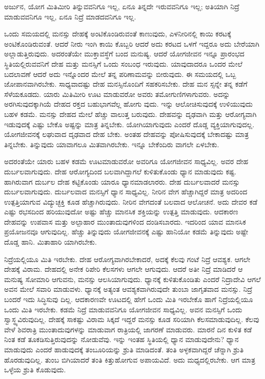 {\small ಅರ್ಜುನ, ಯೋಗ ಮಿತಿಮೀರಿ ತಿನ್ನುವವನಿಗೂ ಇಲ್ಲ, ಏನೂ ತಿನ್ನದೇ ಇರುವವನಿಗೂ ಇಲ್ಲ; ಅತಿಯಾಗಿ ನಿದ್ರೆ ಮಾಡುವವನಿಗೂ ಇಲ್ಲ, ಏನೂ ನಿದ್ರೆ ಮಾಡದವನಿಗೂ ಇಲ್ಲ.}

ಒಂದು ಸಮಯದಲ್ಲಿ ಮನಸ್ಸು ದೇಹಕ್ಕೆ ಅಂಟಿಕೊಂಡಿರುವಂತೆ ಕಾಣುವುದು, ಎಳನೀರಿನಲ್ಲಿ ಕಾಯಿ ಕರಟಕ್ಕೆ ಅಂಟಿಕೊಂಡಿರುವಂತೆ. ಆದರೆ ನೀರು ಇಂಗಿ ಕಾಯಿ ಕೊಬ್ಬರಿ ಆದರೆ ಅದು ಕರಟದ ಒಳಗೆ ಇದ್ದರೂ ಅದು ಬೇರೆಯಾಗಿ ಅಲ್ಲಾಡುತ್ತಿರುವುದು. ಅದರಂತೆಯೇ ಮುಕ್ತಾವಸ್ಥೆಗೆ ಬಂದ ಮನುಷ್ಯ. ಆದರೆ ಯೋಗಜೀವನ ಇನ್ನೂ ಪ್ರಾರಂಭದ ಸ್ಥಿತಿಯಲ್ಲಿರುವವನಿಗೆ ದೇಹ ಮತ್ತು ಮನಸ್ಸಿಗೆ ಒಂದು ಸಂಬಂಧ ಇರುವುದು. ಯಾವುದಾದರೂ ಒಂದರ ಮೇಲೆ ಬದಲಾವಣೆ ಆದರೆ ಅದು ಇನ್ನೊಂದರ ಮೇಲೆ ತನ್ನ ಪರಿಣಾಮವನ್ನು ಬೀರುವುದು. ಈ ಸಮಯದಲ್ಲಿ ಒಬ್ಬ ಜೋಪಾನವಾಗಿರಬೇಕು. ಸಾಧ್ಯವಾದಷ್ಟು ದೇಹ ಮನಸ್ಸಿನೊಂದಿಗೆ ಸಹಕರಿಸಬೇಕು. ದೇಹ ಮನ ಸ್ಸನ್ನೇ ತನ್ನ ಕಡೆಗೆ ಸೆಳೆಯಕೂಡದು. ಯಾರು ಮಿತಿಮೀರಿ ಊಟ ಮಾಡುವರೋ ಅವರು ತಮೋಗುಣಿಗಳಾಗುವರು. ಅದನ್ನು ಅರಗಿಸುವುದಕ್ಕಾಗಿಯೆ ದೇಹದ ರಕ್ತದ ಬಹುಭಾಗವೆಲ್ಲ ಹೋಗು ವುದು. ಇನ್ನು ಆಲೋಚಿಸುವುದಕ್ಕೆ ಉಳಿಯುವುದು ಬಹಳ ಕಡಮೆ. ಮನಸ್ಸು ದೇಹದ ಮೇಲೆ ಹೆಚ್ಚು ವಾಲುತ್ತ ಬರುವುದು. ದೇಹವನ್ನು ದೃಢವಾಗಿ ಮತ್ತು ಆರೋಗ್ಯವಾಗಿ ಇಡುವುದಕ್ಕೆ ಎಷ್ಟು ಬೇಕೊ ಅಷ್ಟನ್ನು ಮಾತ್ರ ತಿನ್ನಬೇಕು. ಯೋಗಿಯಾಗುವುದು ಎಂದರೆ ದೊಡ್ಡ ವ್ಯಕ್ತಿಯಾಗುವುದಲ್ಲ. ಯೋಗಜೀವನಕ್ಕೆ ಲಘುವಾದ ದೃಢವಾದ ದೇಹ ಬೇಕು. ಅಂತಹ ದೇಹವನ್ನು ಪೋಷಿಸುವುದಕ್ಕೆ ಬೇಕಾದಷ್ಟು ಮಾತ್ರ ತಿನ್ನಬೇಕು. ತಿನ್ನುವುದು ಯಾವಾಗಲೂ ಮಿತವಾಗಿರಬೇಕು. ಇನ್ನೂ ಬೇಕೆಂದಿರು ವಾಗಲೇ ಏಳಬೇಕು.

ಅದರಂತೆಯೇ ಯಾರು ಬಹಳ ಕಡಮೆ ಊಟಮಾಡುವರೋ ಅವರಿಗೂ ಯೋಗಜೀವನ ಸಾಧ್ಯವಿಲ್ಲ. ಅವರ ದೇಹ ದುರ್ಬಲವಾಗುವುದು. ದೇಹ ಆರೋಗ್ಯದಿಂದ ಬಲವಾಗಿದ್ದಾಗಲೆ ಕುಳಿತುಕೊಂಡು ಧ್ಯಾನ ಮಾಡುವುದು ಕಷ್ಟ. ಹಾಗಿರುವಾಗ ದುರ್ಬಲ ದೇಹ ಕಟ್ಟಿಕೊಂಡು ಯಾರೂ ಧ್ಯಾನಮಾಡಲಾರರು. ದೇಹ ದುರ್ಬಲವಾದರೆ ಮನಸ್ಸು ದುರ್ಬಲವಾಗುವುದು. ದುರ್ಬಲವಾದ ಮನಸ್ಸಿಗೆ ಧ್ಯಾನ ಸಾಧ್ಯವಿಲ್ಲ. ನೀರಿನ ವೇಗ ಹೆಚ್ಚಾಗಿದ್ದರೆ ಮಾತ್ರ ಅದರಿಂದ ಉತ್ಪತ್ತಿಯಾಗುವ ವಿದ್ಯುಚ್ಛಕ್ತಿ ಕೂಡ ಹೆಚ್ಚಾಗಿರುವುದು. ನೀರಿನ ವೇಗದಂತೆ ಬಲವಾದ ಆಲೋಚನೆ. ಅದು ದೇವರ ಕಡೆ ಎಷ್ಟು ರಭಸದಿಂದ ಹರಿಯುವುದೋ ಅಷ್ಟು ಹೆಚ್ಚು ಮಾನಸಿಕ ಶಕ್ತಿಯನ್ನು ಉತ್ಪತ್ತಿ ಮಾಡುವುದು. ಆದಕಾರಣ ದೇಹವನ್ನು ಉಪವಾಸ ಮತ್ತು ಅಲ್ಪಾಹಾರ ಮುಂತಾದುವುಗಳಿಂದ ದಂಡಿಸಬಾರದು. ಇದರಿಂದ ಯಾವ ಮಾನಸಿಕ ಪ್ರಯೋಜನವೂ ಆಗುವುದಿಲ್ಲ. ಹೆಚ್ಚು ತಿನ್ನುವುದು ಯೋಗಜೀವನಕ್ಕೆ ಎಷ್ಟು ಹಾನಿಯೋ ಕಡಮೆ ತಿನ್ನುವುದು ಅಷ್ಟೇ ದೊಡ್ಡ ಹಾನಿ. ಮಿತಾಹಾರಿ ಯಾಗಿರಬೇಕು.

ನಿದ್ರೆಯಲ್ಲಿಯೂ ಮಿತಿ ಇರಬೇಕು. ದೇಹ ಆರೋಗ್ಯವಾಗಿರಬೇಕಾದರೆ, ಅದಕ್ಕೆ ಕೆಲವು ಗಂಟೆ ನಿದ್ರೆ ಆವಶ್ಯಕ. ಆಗಲೇ ದೇಹಕ್ಕೆ ವಿರಾಮ. ದೇಹದಲ್ಲಿ ಅನೇಕ ರಿಪೇರಿ ಕೆಲಸಗಳು ಆಗಲೇ ಆಗುವುದು. ಆದರೆ ಅತೀ ನಿದ್ರೆ ಮಾಡಿದರೆ ಆ ಮನುಷ್ಯ ಸೋಮಾರಿ ಆಗುವನು, ಮನಸ್ಸು ಆಲಸಿಯಾಗುವುದು. ಧ್ಯಾನಕ್ಕೆ ಕುಳಿತುಕೊಂಡಿತು ಎಂದರೆ ನಿದ್ರಾದೇವಿ ಆಗಲೆ ಅವನ ಮೇಲೆ ಸವಾರಿ ಮಾಡುವಳು. ಧ್ಯಾನಕ್ಕೆ ಅತ್ಯಂತ ಆವಶ್ಯಕವಾಗಿರುವುದೇ ತುಂಬಾ ಜಾಗೃತವಾದ ಮನಸ್ಸು. ನಿದ್ರೆ ಬಂದರೆ ಇದು ಸಿದ್ಧಿಸುವು ದಿಲ್ಲ. ಆದಕಾರಣವೇ ಊಟದಲ್ಲಿ ಹೇಗೆ ಒಂದು ಮಿತಿ ಇರಬೇಕೊ ಹಾಗೆ ನಿದ್ರೆಯಲ್ಲಿಯೂ ಒಂದು ಮಿತಿ ಇರಬೇಕು. ಕಡಮೆ ನಿದ್ರೆ ಮಾಡುವವನಿಗೂ ಯೋಗಜೀವನ ಸಾಧ್ಯವಿಲ್ಲ. ಅವನ ಮನಸ್ಸಿಗೆ ಒಂದು ಸ್ವಾಸ್ಥ್ಯವಿರುವುದಿಲ್ಲ. ದೇಹಕ್ಕೆ ಸಾಕಷ್ಟು ವಿರಾಮ ಸಿಕ್ಕದೆ ಇದ್ದರೆ ಮನಸ್ಸು ಕೂಡ ಸರಿಯಾಗಿ ಕೆಲಸಮಾಡುವುದಿಲ್ಲ. ಕೆಲವು ವೇಳೆ ಶಿವರಾತ್ರಿ ಮುಂತಾದುವುಗಳನ್ನು ಮಾಡುವಾಗ ರಾತ್ರಿಯಲ್ಲಿ ಜಾಗರಣೆ ಮಾಡುವರು. ಮಾರನೆ ದಿನ ಕುಳಿತ ಕಡೆ ನಿಂತ ಕಡೆ ತೂಕಡಿಸುತ್ತಿರುವುದನ್ನು ನೋಡುವೆವು. ಇನ್ನು ಇಂತಹ ಸ್ಥಿತಿಯಲ್ಲಿ ಧ್ಯಾನ ಮಾಡುವುದೇನು? ಧ್ಯಾನ ಮಾಡುವುದು ಎಂದರೆ ಹಾಡುವುದಕ್ಕೆ ತಂಬೂರಿಯನ್ನು ಶ್ರುತಿ ಮಾಡಿದಂತೆ. ತಂತಿ ಅಳ್ಳಕವಾಗಿದ್ದರೆ ಚೆನ್ನಾಗಿ ಶ್ರುತಿ ಹೊರಡುವುದಿಲ್ಲ. ತುಂಬ ಬಿಗಿಯಾದರೆ ತಂತಿ ಕಿತ್ತುಹೋಗುವ ಅಪಾಯವಿದೆ. ಅದು ಮಧ್ಯದಲ್ಲಿರಬೇಕು. ಆಗ ಮಾತ್ರ ಒಳ್ಳೆಯ ಶ್ರುತಿ ಕೊಡುವುದು.

